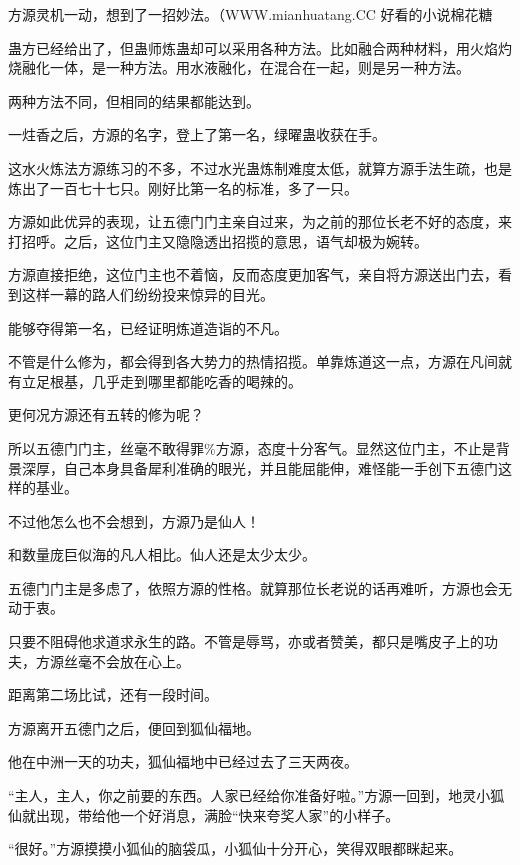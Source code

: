 
\begin{this_body}

方源灵机一动，想到了一招妙法。（WWW.mianhuatang.CC 好看的小说棉花糖

蛊方已经给出了，但蛊师炼蛊却可以采用各种方法。比如融合两种材料，用火焰灼烧融化一体，是一种方法。用水液融化，在混合在一起，则是另一种方法。

两种方法不同，但相同的结果都能达到。

一炷香之后，方源的名字，登上了第一名，绿曜蛊收获在手。

这水火炼法方源练习的不多，不过水光蛊炼制难度太低，就算方源手法生疏，也是炼出了一百七十七只。刚好比第一名的标准，多了一只。

方源如此优异的表现，让五德门门主亲自过来，为之前的那位长老不好的态度，来打招呼。之后，这位门主又隐隐透出招揽的意思，语气却极为婉转。

方源直接拒绝，这位门主也不着恼，反而态度更加客气，亲自将方源送出门去，看到这样一幕的路人们纷纷投来惊异的目光。

能够夺得第一名，已经证明炼道造诣的不凡。

不管是什么修为，都会得到各大势力的热情招揽。单靠炼道这一点，方源在凡间就有立足根基，几乎走到哪里都能吃香的喝辣的。

更何况方源还有五转的修为呢？

所以五德门门主，丝毫不敢得罪\%方源，态度十分客气。显然这位门主，不止是背景深厚，自己本身具备犀利准确的眼光，并且能屈能伸，难怪能一手创下五德门这样的基业。

不过他怎么也不会想到，方源乃是仙人！

和数量庞巨似海的凡人相比。仙人还是太少太少。

五德门门主是多虑了，依照方源的性格。就算那位长老说的话再难听，方源也会无动于衷。

只要不阻碍他求道求永生的路。不管是辱骂，亦或者赞美，都只是嘴皮子上的功夫，方源丝毫不会放在心上。

距离第二场比试，还有一段时间。

方源离开五德门之后，便回到狐仙福地。

他在中洲一天的功夫，狐仙福地中已经过去了三天两夜。

“主人，主人，你之前要的东西。人家已经给你准备好啦。”方源一回到，地灵小狐仙就出现，带给他一个好消息，满脸“快来夸奖人家”的小样子。

“很好。”方源摸摸小狐仙的脑袋瓜，小狐仙十分开心，笑得双眼都眯起来。


\end{this_body}
